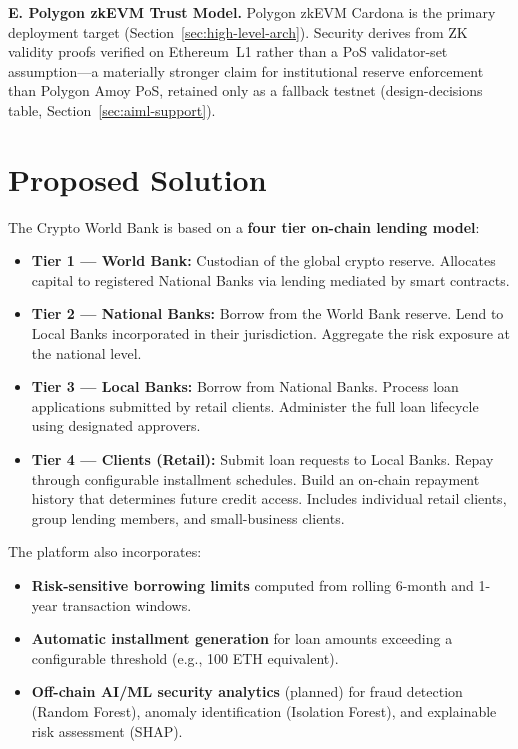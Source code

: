 \documentclass[12pt,a4paper]{report}
\begin{document}
\textbf{E. Polygon zkEVM Trust Model.}
Polygon zkEVM Cardona is the primary deployment target (Section~\ref{sec:high-level-arch}). Security derives from ZK validity proofs verified on Ethereum~L1 rather than a PoS validator-set assumption---a materially stronger claim for institutional reserve enforcement than Polygon Amoy PoS, retained only as a fallback testnet (design-decisions table, Section~\ref{sec:aiml-support}).

\section{Proposed Solution}
\label{sec:proposed-solution}

The Crypto World Bank is based on a \textbf{four tier on-chain lending model}:

\begin{itemize}[noitemsep]
\item \textbf{Tier 1 --- World Bank:} Custodian of the global crypto reserve. Allocates capital to registered National Banks via lending mediated by smart contracts.
\item \textbf{Tier 2 --- National Banks:} Borrow from the World Bank reserve. Lend to Local Banks incorporated in their jurisdiction. Aggregate the risk exposure at the national level.
\item \textbf{Tier 3 --- Local Banks:} Borrow from National Banks. Process loan applications submitted by retail clients. Administer the full loan lifecycle using designated approvers.
\item \textbf{Tier 4 --- Clients (Retail):} Submit loan requests to Local Banks. Repay through configurable installment schedules. Build an on-chain repayment history that determines future credit access. Includes individual retail clients, group lending members, and small-business clients.
\end{itemize}

The platform also incorporates:

\begin{itemize}[noitemsep]
\item \textbf{Risk-sensitive borrowing limits} computed from rolling 6-month and 1-year transaction windows.
\item \textbf{Automatic installment generation} for loan amounts exceeding a configurable threshold (e.g., 100 ETH equivalent).
\item \textbf{Off-chain AI/ML security analytics} (planned) for fraud detection (Random Forest), anomaly identification (Isolation Forest), and explainable risk assessment (SHAP).
\end{itemize}
\end{document}
